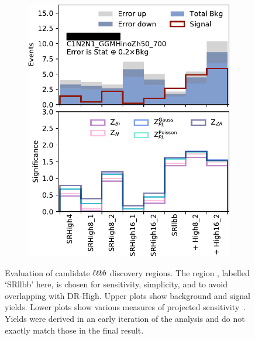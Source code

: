\begin{figure}[tp]
\begin{subfigure}{0.48\textwidth}
\includegraphics[width=\textwidth]{figures/2ljets_disco_llbb_C1N2N1_GGMHinoZh50_700.png}
\caption{}
\end{subfigure}
\caption[
Evaluation of candidate $\llbb$ discovery regions
]{%
Evaluation of candidate $\llbb$ discovery regions.
The region \srllbb, labelled `SRllbb' here, is chosen for
sensitivity, simplicity, and to avoid overlapping with DR-High.
Upper plots show background and signal yields.
Lower plots show various measures of projected
sensitivity~\cite{cousins2008evaluation}.
Yields were derived in an early iteration of the analysis and do not exactly
match those in the final result.
}
\label{fig:2ljets_disco_trials_llbb}
\end{figure}

